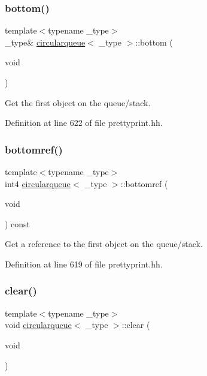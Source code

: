 \subsubsection{\texorpdfstring{bottom()}{bottom()}}
{\footnotesize\ttfamily template$<$typename \+\_\+type$>$ \\
\+\_\+type\& \mbox{\hyperlink{classcircularqueue}{circularqueue}}$<$ \+\_\+type $>$\+::bottom (\begin{DoxyParamCaption}\item[{void}]{ }\end{DoxyParamCaption})\hspace{0.3cm}{\ttfamily [inline]}}



Get the first object on the queue/stack. 



Definition at line 622 of file prettyprint.\+hh.

\mbox{\label{classcircularqueue_af5fe2fe7f63076e4864c2f576ee45739}} 
\subsubsection{\texorpdfstring{bottomref()}{bottomref()}}
{\footnotesize\ttfamily template$<$typename \+\_\+type$>$ \\
int4 \mbox{\hyperlink{classcircularqueue}{circularqueue}}$<$ \+\_\+type $>$\+::bottomref (\begin{DoxyParamCaption}\item[{void}]{ }\end{DoxyParamCaption}) const\hspace{0.3cm}{\ttfamily [inline]}}



Get a reference to the first object on the queue/stack. 



Definition at line 619 of file prettyprint.\+hh.

\mbox{\label{classcircularqueue_ac205d631400bc42fb797614c89e41c88}} 
\subsubsection{\texorpdfstring{clear()}{clear()}}
{\footnotesize\ttfamily template$<$typename \+\_\+type$>$ \\
void \mbox{\hyperlink{classcircularqueue}{circularqueue}}$<$ \+\_\+type $>$\+::clear (\begin{DoxyParamCaption}\item[{void}]{ }\end{DoxyParamCaption})\hspace{0.3cm}{\ttfamily [inline]}}



